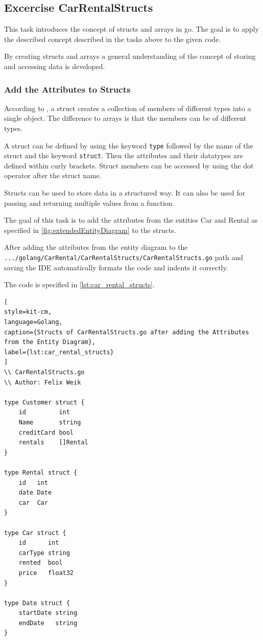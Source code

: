 \subsection{Excercise CarRentalStructs}
\label{sec:car_rental_structs}
This task introduces the concept of structs and arrays in go.
The goal is to apply the described concept described in the tasks above to the given code.

By creating structs and arrays a general understanding of the concept of storing and accessing data is developed.

\subsubsection*{Add the Attributes to Structs}
According to \cite{W3-STR}, a struct creates a collection of members of different types into a single object.
The difference to arrays is that the members can be of different types.

A struct can be defined by using the keyword \texttt{type} followed by the name of the struct and the keyword \texttt{struct}.
Then the attributes and their datatypes are defined within curly brackets.
Struct members can be accessed by using the dot operator after the struct name.

Structs can be used to store data in a structured way.
It can also be used for passing and returning multiple values from a function.

The goal of this task is to add the attributes from the entities Car and Rental as specified in \autoref{fig:extendedEntityDiagram} to the structs.

After adding the attributes from the entity diagram to the \hfill \newline \texttt{.../golang/CarRental/CarRentalStructs/CarRentalStructs.go} path and saving
the IDE automatically formats the code and indents it correctly.

The code is specified in \autoref{lst:car_rental_structs}.
\begin{lstlisting}[
style=kit-cm,
language=Golang,
caption={Structs of CarRentalStructs.go after adding the Attributes from the Entity Diagram},
label={lst:car_rental_structs}
]
\\ CarRentalStructs.go
\\ Author: Felix Weik

type Customer struct {
	id         int
	Name       string
	creditCard bool
	rentals    []Rental
}

type Rental struct {
	id   int
	date Date
	car  Car
}

type Car struct {
	id      int
	carType string
	rented  bool
	price   float32
}

type Date struct {
	startDate string
	endDate   string
}
\end{lstlisting}


